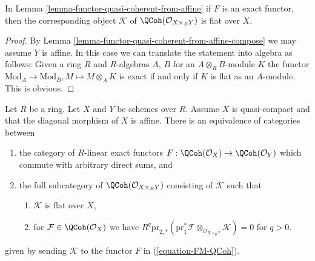 \begin{lemma}
\label{lemma-coh-noetherian-from-affine-flat}
In Lemma \ref{lemma-functor-quasi-coherent-from-affine}
if $F$ is an exact functor, then the corresponding object
$\mathcal{K}$ of $\QCoh(\mathcal{O}_{X \times_R Y})$ is flat over $X$.
\end{lemma}

\begin{proof}
By Lemma \ref{lemma-functor-quasi-coherent-from-affine-compose}
we may assume $Y$ is affine. In this case we can translate the statement
into algebra as follows: Given a ring $R$ and $R$-algebras $A$, $B$
for an $A \otimes_R B$-module $K$ the functor
$\text{Mod}_A \to \text{Mod}_B, M \mapsto M \otimes_A K$
is exact if and only if $K$ is flat as an $A$-module.
This is obvious.
\end{proof}

\begin{lemma}
\label{lemma-functor-quasi-coherent-from-affine-diagonal}
Let $R$ be a ring. Let $X$ and $Y$ be schemes over $R$. Assume $X$ is
quasi-compact and that the diagonal morphism of $X$ is affine.
There is an equivalence of categories between
\begin{enumerate}
\item the category of $R$-linear exact functors
$F : \QCoh(\mathcal{O}_X) \to \QCoh(\mathcal{O}_Y)$
which commute with arbitrary direct sums, and
\item the full subcategory of $\QCoh(\mathcal{O}_{X \times_R Y})$ consisting
of $\mathcal{K}$ such that
\begin{enumerate}
\item $\mathcal{K}$ is flat over $X$,
\item for $\mathcal{F} \in \QCoh(\mathcal{O}_X)$ we have
$R^q\text{pr}_{2, *}(\text{pr}_1^*\mathcal{F}
\otimes_{\mathcal{O}_{X \times_R Y}} \mathcal{K}) = 0$ for $q > 0$.
\end{enumerate}
\end{enumerate}
given by sending $\mathcal{K}$ to the functor $F$ in (\ref{equation-FM-QCoh}).
\end{lemma}

